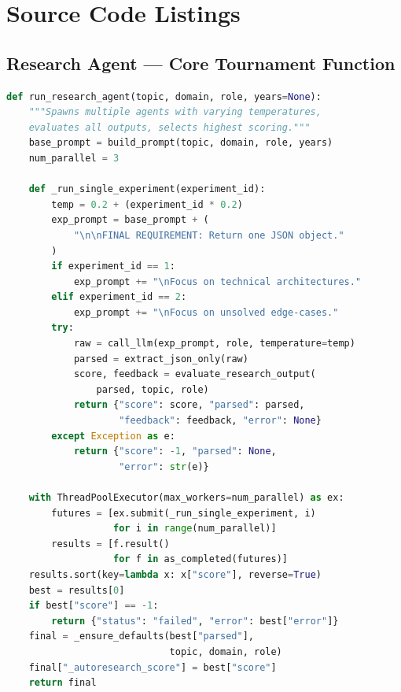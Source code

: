 \chapter{Source Code Listings}

\section{Research Agent --- Core Tournament Function}

\begin{lstlisting}[language=Python, caption={run\_research\_agent() --- Tournament-Based Execution}, label={lst:app_research}]
def run_research_agent(topic, domain, role, years=None):
    """Spawns multiple agents with varying temperatures,
    evaluates all outputs, selects highest scoring."""
    base_prompt = build_prompt(topic, domain, role, years)
    num_parallel = 3

    def _run_single_experiment(experiment_id):
        temp = 0.2 + (experiment_id * 0.2)
        exp_prompt = base_prompt + (
            "\n\nFINAL REQUIREMENT: Return one JSON object."
        )
        if experiment_id == 1:
            exp_prompt += "\nFocus on technical architectures."
        elif experiment_id == 2:
            exp_prompt += "\nFocus on unsolved edge-cases."
        try:
            raw = call_llm(exp_prompt, role, temperature=temp)
            parsed = extract_json_only(raw)
            score, feedback = evaluate_research_output(
                parsed, topic, role)
            return {"score": score, "parsed": parsed,
                    "feedback": feedback, "error": None}
        except Exception as e:
            return {"score": -1, "parsed": None,
                    "error": str(e)}

    with ThreadPoolExecutor(max_workers=num_parallel) as ex:
        futures = [ex.submit(_run_single_experiment, i)
                   for i in range(num_parallel)]
        results = [f.result()
                   for f in as_completed(futures)]
    results.sort(key=lambda x: x["score"], reverse=True)
    best = results[0]
    if best["score"] == -1:
        return {"status": "failed", "error": best["error"]}
    final = _ensure_defaults(best["parsed"],
                             topic, domain, role)
    final["_autoresearch_score"] = best["score"]
    return final
\end{lstlisting}

